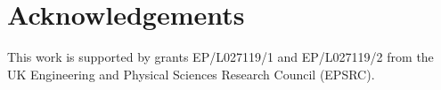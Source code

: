\documentclass{article}
\begin{document}
\section{Acknowledgements}
 This work is supported by grants EP/L027119/1 and EP/L027119/2 from the UK Engineering and Physical Sciences Research Council (EPSRC).
% 
%
%
%

\printbibheading[title={References},heading=bibnumbered]
\printbibliography[heading=none]
\end{document}
